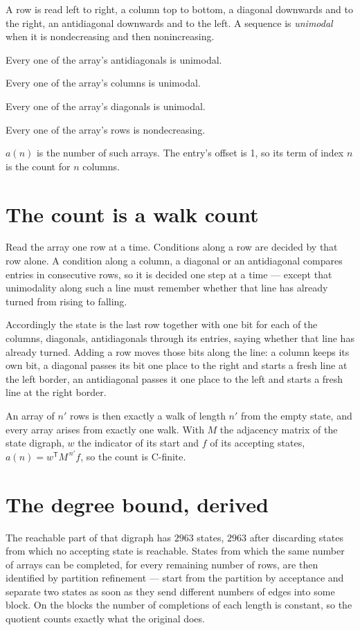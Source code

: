 \documentclass[11pt]{article}
\theoremstyle{definition}
\begin{document}
A row is read left to right, a column top to bottom, a diagonal downwards and to the right, an antidiagonal downwards and to the left. A sequence is {\itshape unimodal} when it is nondecreasing and then nonincreasing.

Every one of the array's antidiagonals is unimodal.

Every one of the array's columns is unimodal.

Every one of the array's diagonals is unimodal.

Every one of the array's rows is nondecreasing.

$a(n)$ is the number of such arrays. The entry's offset is 1, so its term of index $n$ is the count for $n$ columns.

\section{The count is a walk count}

Read the array one row at a time. Conditions along a row are decided by that row alone. A condition along a column, a diagonal or an antidiagonal compares entries in consecutive rows, so it is decided one step at a time --- except that unimodality along such a line must remember whether that line has already turned from rising to falling.

Accordingly the state is the last row together with one bit for each of the columns, diagonals, antidiagonals through its entries, saying whether that line has already turned. Adding a row moves those bits along the line: a column keeps its own bit, a diagonal passes its bit one place to the right and starts a fresh line at the left border, an antidiagonal passes it one place to the left and starts a fresh line at the right border.

An array of $n'$ rows is then exactly a walk of length $n'$ from the empty state, and every array arises from exactly one walk. With $M$ the adjacency matrix of the state digraph, $w$ the indicator of its start and $f$ of its accepting states, $a(n) = w^{\mathsf T}M^{\,n'}f$, so the count is C-finite.

\section{The degree bound, derived}

The reachable part of that digraph has $2963$ states, $2963$ after discarding states from which no accepting state is reachable. States from which the same number of arrays can be completed, for every remaining number of rows, are then identified by partition refinement --- start from the partition by acceptance and separate two states as soon as they send different numbers of edges into some block. On the blocks the number of completions of each length is constant, so the quotient counts exactly what the original does.
\end{document}
